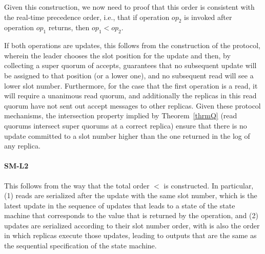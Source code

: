 Given this construction, we now need to proof that this order is
consistent with the real-time precedence order, i.e., that if
operation $op_2$ is invoked after operation $op_1$ returns, then
$op_1 < op_2$.

If both operations are updates, this follows from the
construction of the protocol, wherein the leader chooses the slot
position for the update and then, by collecting a super quorum of
accepts, guarantees that no subsequent update will be assigned to
that position (or a lower one), and no subsequent read will see a
lower slot number. Furthermore, for the case that the first
operation is a read, it will require a unanimous read quorum, and
additionally the replicas in this read quorum have not sent out
accept messages to other replicas. Given these protocol
mechanisms, the intersection property implied by
Theorem~\ref{thrmQ} (read quorums intersect super quorums at a
correct replica) ensure that there is no update committed to a
slot number higher than the one returned in the log of any
replica.

\paragraph{SM-L2}
This follows from the way that the total order $<$ is
constructed. In particular, (1) reads are serialized after the
update with the same slot number, which is the latest update
in the sequence of updates that leads to a state of the state machine
that corresponds to the value that is returned by the
operation, and (2) updates are serialized according to their
slot number order, with is also the order in which replicas execute those updates,
leading to outputs that are the same as the sequential specification
of the state machine.
